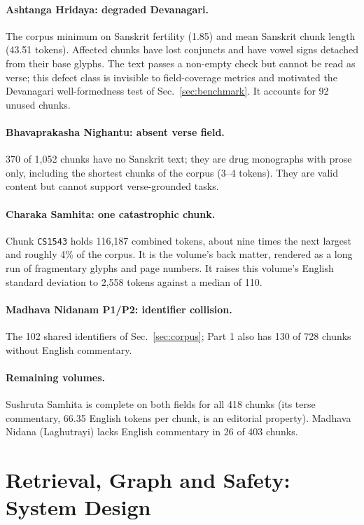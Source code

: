 \documentclass[10pt,twocolumn,letterpaper]{article}
\begin{document}
\paragraph{Ashtanga Hridaya: degraded Devanagari.}
The corpus minimum on Sanskrit fertility (1.85) and mean Sanskrit chunk length
(43.51 tokens). Affected chunks have lost conjuncts and have vowel signs detached
from their base glyphs. The text passes a non-empty check but cannot be read as
verse; this defect class is invisible to field-coverage metrics and motivated the
Devanagari well-formedness test of Sec.~\ref{sec:benchmark}. It accounts for 92
unused chunks.

\paragraph{Bhavaprakasha Nighantu: absent verse field.}
370 of 1{,}052 chunks have no Sanskrit text; they are drug monographs with prose
only, including the shortest chunks of the corpus (3--4 tokens). They are valid
content but cannot support verse-grounded tasks.

\paragraph{Charaka Samhita: one catastrophic chunk.}
Chunk \texttt{CS1543} holds 116{,}187 combined tokens, about nine times the next
largest and roughly 4\% of the corpus. It is the volume's back matter, rendered
as a long run of fragmentary glyphs and page numbers. It raises this volume's
English standard deviation to 2{,}558 tokens against a median of 110.

\paragraph{Madhava Nidanam P1/P2: identifier collision.}
The 102 shared identifiers of Sec.~\ref{sec:corpus}; Part 1 also has 130 of 728
chunks without English commentary.

\paragraph{Remaining volumes.}
Sushruta Samhita is complete on both fields for all 418 chunks (its terse
commentary, 66.35 English tokens per chunk, is an editorial property). Madhava
Nidana (Laghutrayi) lacks English commentary in 26 of 403 chunks.

\section{Retrieval, Graph and Safety: System Design}
\label{sec:system}
\end{document}
